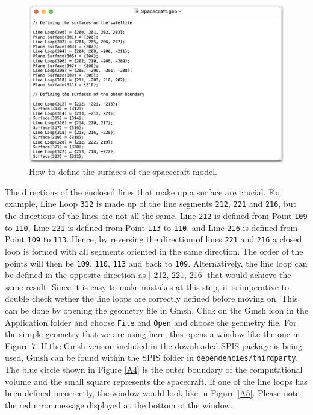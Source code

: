 \documentclass[a4paper, 12pt]{article}
\begin{document}
\begin{figure}[!ht]
    \centering
    \includegraphics[width=1\textwidth]{figA3.jpg}
    \caption{How to define the surfaces of the spacecraft model.}
    \label{A3}
\end{figure}

The directions of the enclosed lines that make up a surface are crucial. For example, Line Loop \verb|312| is made up of the line segments \verb|212|, \verb|221| and \verb|216|, but the directions of the lines are not all the same. Line \verb|212| is defined from Point \verb|109| to \verb|110|, Line \verb|221| is defined from Point \verb|113| to \verb|110|, and Line \verb|216| is defined from Point \verb|109| to \verb|113|. Hence, by reversing the direction of lines \verb|221| and \verb|216| a closed loop is formed with all segments oriented in the same direction. The order of the points will then be \verb|109|, \verb|110|, \verb|113| and back to \verb|109|. Alternatively, the line loop can be defined in the opposite direction as |{-212, 221, 216}| that would achieve the same result. Since it is easy to make mistakes at this step, it is imperative to double check wether the line loops are correctly defined before moving on. This can be done by opening the geometry file in Gmsh. Click on the Gmsh icon in the Application folder and choose \verb|File| and \verb|Open| and choose the geometry file. For the simple geometry that we are using here, this opens a window like the one in Figure 7. If the Gmsh version included in the downloaded SPIS package is being used, Gmsh can be found within the SPIS folder in \verb|dependencies/thirdparty|.\\

The blue circle shown in Figure \ref{A4} is the outer boundary of the computational volume and the small square represents the spacecraft. If one of the line loops has been defined incorrectly, the window would look like in Figure \ref{A5}. Please note the red error message displayed at the bottom of the window.
\end{document}
